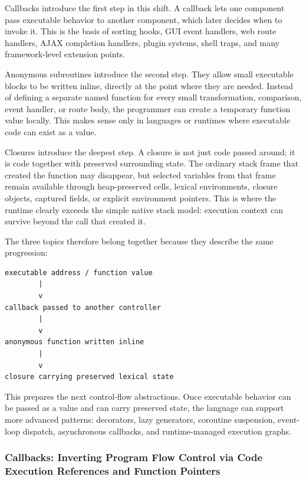 \documentclass[a4paper,twoside]{report}
\begin{document}
Callbacks introduce the first step in this shift. A callback lets one component pass executable behavior to another component, which later decides when to invoke it. This is the basis of sorting hooks, GUI event handlers, web route handlers, AJAX completion handlers, plugin systems, shell traps, and many framework-level extension points.

Anonymous subroutines introduce the second step. They allow small executable blocks to be written inline, directly at the point where they are needed. Instead of defining a separate named function for every small transformation, comparison, event handler, or route body, the programmer can create a temporary function value locally. This makes sense only in languages or runtimes where executable code can exist as a value.

Closures introduce the deepest step. A closure is not just code passed around; it is code together with preserved surrounding state. The ordinary stack frame that created the function may disappear, but selected variables from that frame remain available through heap-preserved cells, lexical environments, closure objects, captured fields, or explicit environment pointers. This is where the runtime clearly exceeds the simple native stack model: execution context can survive beyond the call that created it.

The three topics therefore belong together because they describe the same progression:

\begin{verbatim}
executable address / function value
        |
        v
callback passed to another controller
        |
        v
anonymous function written inline
        |
        v
closure carrying preserved lexical state
\end{verbatim}

This prepares the next control-flow abstractions. Once executable behavior can be passed as a value and can carry preserved state, the language can support more advanced patterns: decorators, lazy generators, coroutine suspension, event-loop dispatch, asynchronous callbacks, and runtime-managed execution graphs.





\subsubsection{Callbacks: Inverting Program Flow Control via Code Execution References and Function Pointers}
\end{document}
